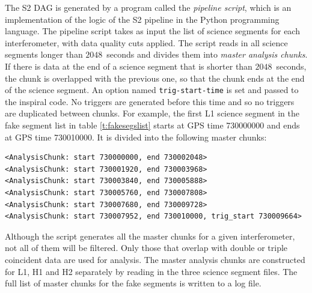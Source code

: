 The S2 DAG is generated by a program called the \emph{pipeline script}, which
is an implementation of the logic of the S2 pipeline in the Python programming
language. The pipeline script takes as input the list of science segments for
each interferometer, with data quality cuts applied. The script reads in all
science segments longer than $2048$~seconds and divides them into \emph{master
analysis chunks}. If there is data at the end of a science segment that is
shorter than $2048$~seconds, the chunk is overlapped with the previous one, so
that the chunk ends at the end of the science segment. An option named
\verb|trig-start-time| is set and passed to the inspiral code. No triggers are
generated before this time and so no triggers are duplicated between chunks.
For example, the first L1 science segment in the fake segment list in table
\ref{t:fakesegslist} starts at GPS time 730000000 and ends at GPS time
730010000. It is divided into the following master chunks:
\begin{verbatim}
<AnalysisChunk: start 730000000, end 730002048>
<AnalysisChunk: start 730001920, end 730003968> 
<AnalysisChunk: start 730003840, end 730005888> 
<AnalysisChunk: start 730005760, end 730007808> 
<AnalysisChunk: start 730007680, end 730009728> 
<AnalysisChunk: start 730007952, end 730010000, trig_start 730009664>
\end{verbatim}
Although the script generates all the master chunks for a given
interferometer, not all of them will be filtered. Only those that overlap with
double or triple coincident data are used for analysis.  The master analysis
chunks are constructed for L1, H1 and H2 separately by reading in the three
science segment files. The full list of master chunks for the fake segments is
written to a log file.

